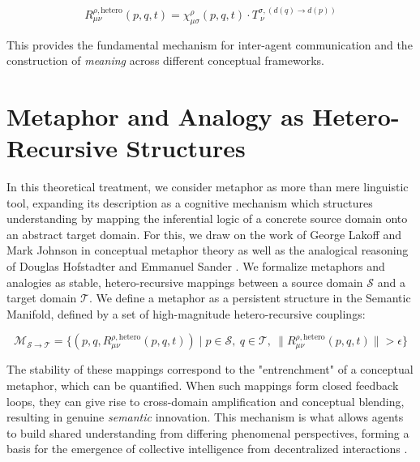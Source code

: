 \begin{equation}
R^{\rho, \text{hetero}}_{\mu\nu}(p, q, t) = \chi^\rho_{\mu\sigma}(p, q, t) \cdot T_{\ \nu}^{\sigma, (d(q) \to d(p))}
\end{equation}

This provides the fundamental mechanism for inter-agent communication and the construction of \textit{meaning} across different conceptual frameworks.


\section{Metaphor and Analogy as Hetero-Recursive Structures}
\label{14.2:metaphor_and_analogy_as_hetero_recursive_structures}

In this theoretical treatment, we consider metaphor as more than mere linguistic tool, expanding its description as a cognitive mechanism which structures understanding by mapping the inferential logic of a concrete source domain onto an abstract target domain. For this, we draw on the work of George Lakoff and Mark Johnson in conceptual metaphor theory \autocite{LakoffJohnson1980} as well as the analogical reasoning of Douglas Hofstadter and Emmanuel Sander \autocite{HofstadterSander2013}. We formalize metaphors and analogies as stable, hetero-recursive mappings between a source domain \(\mathcal{S}\) and a target domain \(\mathcal{T}\). We define a metaphor as a persistent structure in the Semantic Manifold, defined by a set of high-magnitude hetero-recursive couplings:

\begin{equation}
\mathcal{M}_{\mathcal{S} \to \mathcal{T}} = \{(p, q, R^{\rho, \text{hetero}}_{\mu\nu}(p, q, t)) \mid p \in \mathcal{S},\ q \in \mathcal{T},\ \|R^{\rho, \text{hetero}}_{\mu\nu}(p, q, t)\| > \epsilon\}
\end{equation}

The stability of these mappings correspond to the "entrenchment" of a conceptual metaphor, which can be quantified. When such mappings form closed feedback loops, they can give rise to cross-domain amplification and conceptual blending, resulting in genuine \textit{semantic} innovation. This mechanism is what allows agents to build shared understanding from differing phenomenal perspectives, forming a basis for the emergence of collective intelligence from decentralized interactions \autocite{Surowiecki2004}.

